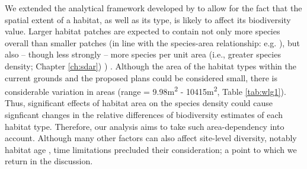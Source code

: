 We extended the analytical framework developed by \cite{Newbold:2015nat} to allow for the fact that the spatial extent of a habitat, as well as its type, is likely to affect its biodiversity value. Larger habitat patches are expected to contain not only more species overall than smaller patches (in line with the species-area relationship: e.g. \citealt{rosenzweig:1995species}), but also -- though less strongly -- more species per unit area (i.e., greater species density; 
\ifappendixStyle %
Chapter \ref{ch:sdar})%
\else
\citealt{Phillips:2015sdar})
\fi
. Although the area of the habitat types within the current grounds and the proposed plans could be considered small, there is considerable variation in areas (range = 9.98m\textsuperscript{2} - 10415m\textsuperscript{2}, 
Table \ref{tab:wlg1}). Thus, significant effects of habitat area on the species density could cause signficant changes in the relative differences of biodiversity estimates of each habitat type. Therefore, our analysis aims to take such area-dependency into account. Although many other factors can also affect site-level diversity, notably habitat age \citep{Sattler:2010le}, time limitations precluded their consideration; a point to which we return in the discussion.



